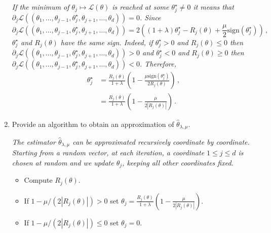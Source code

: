 \documentclass[a4paper,10pt,fleqn]{article}
\newcommand{\eqsp}{\,}
\newcommand{\1}{\ensuremath{\mathbbm{1}}}
\begin{document}
\begin{enumerate}
\vspace{.2cm}

{\em
If the minimum of $\theta_j \mapsto \mathcal{L}(\theta)$ is reached at some $\theta^\star_j\neq 0$ it means that $\partial_j  \mathcal{L}((\theta_1,\ldots,\theta_{j-1},\theta^\star_j,\theta_{j+1},\ldots,\theta_d)) = 0$. Since
$$
\partial_j  \mathcal{L}((\theta_1,\ldots,\theta_{j-1},\theta^\star_j,\theta_{j+1},\ldots,\theta_d)) = 2\left((1+\lambda)\theta^\star_j -R_j(\theta) + \frac{\mu}{2} \mathrm{sign}(\theta^\star_j)\right)\eqsp,
$$
$\theta^\star_j$ and $R_j(\theta)$ have the same sign. Indeed, if $\theta^\star_j > 0 $ and  $R_j(\theta) \leq 0$ then $\partial_j  \mathcal{L}((\theta_1,\ldots,\theta_{j-1},\theta^\star_j,\theta_{j+1},\ldots,\theta_d))>0$ and  $\theta^\star_j<0 $ and  $R_j(\theta)\geq 0$ then $\partial_j  \mathcal{L}((\theta_1,\ldots,\theta_{j-1},\theta^\star_j,\theta_{j+1},\ldots,\theta_d))<0$. Therefore,
\begin{align*}
\theta^\star_j &= \frac{R_j(\theta)}{1+\lambda}\left(1 - \frac{\mu\mathrm{sign}(\theta^\star_j)}{2R_j(\theta)}\right)\eqsp,\\
&= \frac{R_j(\theta)}{1+\lambda}\left(1 - \frac{\mu}{2|R_j(\theta)|}\right)\eqsp.
\end{align*}
}
\item Provide an algorithm to obtain an approximation of $\widehat{\theta}_{\lambda,\mu}$.

\vspace{.2cm}

{\em
The estimator $\widehat{\theta}_{\lambda,\mu}$ can be approximated recursively coordinate by coordinate. Starting from a random vector, at each iteration, a coordinate $1\leq j \leq d$ is chosen at random and we update $\theta_j$, keeping all other coordinates fixed. 
\begin{itemize}
\item Compute $R_j(\theta)$.
\item If $1 - \mu/(2|R_j(\theta)|) >0 $ set $\theta_j = \frac{R_j(\theta)}{1+\lambda}\left(1 - \frac{\mu}{2|R_j(\theta)|}\right)$.
\item If $1 - \mu/(2|R_j(\theta)|) \leq 0 $ set $\theta_j = 0$.
\end{itemize} 
}
\end{enumerate}
\end{document}
